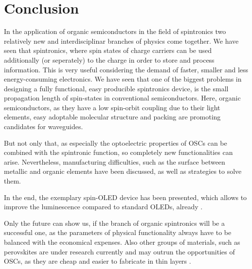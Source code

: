 
\section{Conclusion}
\label{sec:Conclusion}

In the application of organic semiconductors in the field of spintronics two relatively new and interdisciplinar branches of physics come together.
We have seen that spintronics, where spin states of charge carriers can be used additionally (or seperately) to the charge in order to store and process information.
This is very useful considering the demand of faster, smaller and less energy-consuming electronics.
We have seen that one of the biggest problems in designing a fully functional, easy producible spintronics device, is the small propagation length of spin-states in conventional semiconductors.
Here, organic semiconductors, as they have a low spin-orbit coupling due to their light elements, easy adoptable molecular structure and packing are promoting candidates for waveguides.

But not only that, as especially the optoelectric properties of OSCs can be combined with the spintronic function, so completely new functionalities can arise.
Nevertheless, manufacturing difficulties, such as the surface between metallic and organic elements have been discussed, as well as strategies to solve them.

In the end, the exemplary spin-OLED device has been presented, which allows to improve the luminescence compared to standard OLEDs, already \cite{spin-OLED} \cite{appl-organic}.

Only the future can show us, if the branch of organic spintronics will be a successful one, as the parameters of physical functionality always have to be balanced with the economical expenses.
Also other groups of materials, such as perovskites are under research currently and may outrun the opportunities of OSCs, as they are cheap and easier to fabricate in thin layers \cite{perovskite}.




